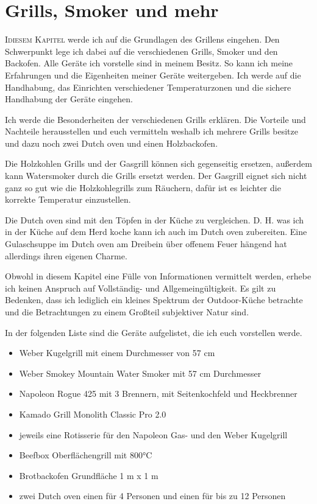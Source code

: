\chapter{Grills, Smoker und mehr}\label{Chapter1}

	\lettrine[lines=3]{I}{diesem Kapitel} werde ich auf die Grundlagen des Grillens 
	eingehen. Den Schwerpunkt lege ich dabei auf die
	verschiedenen Grills, Smoker und den Backofen. Alle Geräte ich vorstelle sind 
	in meinem Besitz. So kann ich  meine Erfahrungen und die Eigenheiten meiner
	Geräte weitergeben. Ich werde auf die Handhabung, das Einrichten verschiedener
	Temperaturzonen und die sichere Handhabung der Geräte eingehen.
	
	Ich werde die Besonderheiten der verschiedenen Grills erklären. Die Vorteile 
	und Nachteile herausstellen und euch vermitteln
	weshalb ich mehrere Grills besitze und dazu noch zwei Dutch oven und einen 
	Holzbackofen.
	
	Die Holzkohlen Grills und der Gasgrill können sich gegenseitig ersetzen, 
	außerdem kann Watersmoker durch die Grills
	ersetzt werden. Der Gasgrill eignet sich nicht ganz so gut wie die 
	Holzkohlegrills zum Räuchern, dafür ist es leichter die korrekte Temperatur
	einzustellen.
	
	Die Dutch oven sind mit den Töpfen in der Küche zu vergleichen. D. H. was ich 
	in der Küche auf dem Herd koche kann ich auch im Dutch oven zubereiten. 
	Eine Gulaschsuppe im Dutch oven am Dreibein über offenem Feuer hängend
	hat allerdings ihren eigenen Charme.
	
	Obwohl in diesem Kapitel eine Fülle von Informationen vermittelt werden, erhebe ich keinen Anspruch auf Vollständig- und Allgemeingültigkeit. Es gilt zu Bedenken, dass 
	ich lediglich ein kleines Spektrum der Outdoor-Küche betrachte und die Betrachtungen zu einem Großteil subjektiver Natur sind.



In der folgenden Liste sind die Geräte aufgelistet, die ich euch vorstellen werde.

\begin{itemize}[noitemsep]
	\item Weber Kugelgrill mit einem Durchmesser von 57 cm
	\item Weber Smokey Mountain Water Smoker mit 57 cm Durchmesser
 	\item Napoleon Rogue 425 mit 3 Brennern, mit Seitenkochfeld und 
 	Heckbrenner
	\item Kamado Grill Monolith Classic Pro 2.0
	\item jeweils eine Rotisserie für den Napoleon Gas- und den Weber Kugelgrill
	\item Beefbox Oberflächengrill mit 800°C
	\item Brotbackofen Grundfläche 1 m x 1 m
	\item zwei Dutch oven einen für 4 Personen und einen für bis zu 12 Personen
\end{itemize}

